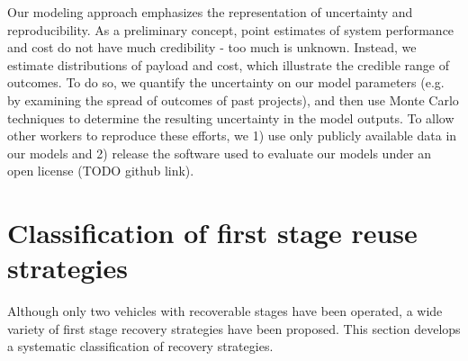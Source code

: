 \documentclass[conf]{new-aiaa}
\begin{document}
\begin{multicols}{2}
Our modeling approach emphasizes the representation of uncertainty and reproducibility. As a preliminary concept, point estimates of system performance and cost do not have much credibility - too much is unknown. Instead, we estimate distributions of payload and cost, which illustrate the credible range of outcomes. To do so, we quantify the uncertainty on our model parameters (e.g. by examining the spread of outcomes of past projects), and then use Monte Carlo techniques to determine the resulting uncertainty in the model outputs. To allow other workers to reproduce these efforts, we 1) use only publicly available data in our models and 2) release the software used to evaluate our models under an open license (TODO github link).

\section{Classification of first stage reuse strategies}
Although only two vehicles with recoverable stages have been operated, a wide variety of first stage recovery strategies have been proposed. This section develops a systematic classification of recovery strategies.


\end{multicols}
\end{document}
